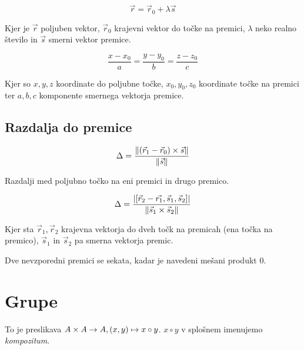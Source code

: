 
\[
	\vec{r} = \vec{r}_0 + \lambda \vec{s}
\]

Kjer je $\vec{r}$ poljuben vektor, $\vec{r}_0$ krajevni vektor do točke na premici, $\lambda$ neko realno število in $\vec{s}$ smerni vektor premice.

\[
	\frac{x-x_0}{a} = \frac{y-y_0}{b} = \frac{z-z_0}{c}
\]

Kjer so $x, y, z$ koordinate do poljubne točke, $x_0, y_0, z_0$ koordinate točke na premici ter $a, b, c$ komponente smernega vektorja premice.

\subsection{Razdalja do premice}


\[
	\Delta = \frac{\| (\vec{r}_1 - \vec{r}_0) \times \vec{s} \|}{\| \vec{s} \|}
\]


Razdalji med poljubno točko na eni premici in drugo premico.


\[
	\Delta = \frac{\left|[\vec{r}_2 - \vec{r_1}, \vec{s}_1, \vec{s}_2]\right|}{\| \vec{s}_1 \times \vec{s}_2 \|}
\]

Kjer sta $\vec{r}_1, \vec{r}_2$ krajevna vektorja do dveh točk na premicah (ena točka na premico), $\vec{s}_1$ in $\vec{s}_2$ pa smerna vektorja premic.

Dve nevzporedni premici se sekata, kadar je navedeni mešani produkt $0$.

\section{Grupe}


To je preslikava $A \times A \to A, (x, y) \mapsto x \circ y$. $x\circ y$ v splošnem imenujemo \textit{kompozitum}.


